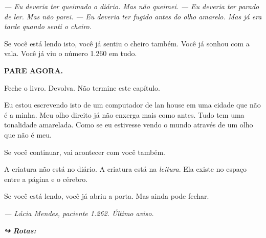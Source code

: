 \noindent \textit{--- Eu deveria ter queimado o diário. Mas não queimei.}
\textit{--- Eu deveria ter parado de ler. Mas não parei.}
\textit{--- Eu deveria ter fugido antes do olho amarelo. Mas já era tarde quando senti o cheiro.}

\noindent Se você está lendo isto, você já sentiu o cheiro também.
Você já sonhou com a vala.
Você já viu o número 1.260 em tudo.

\noindent \textbf{PARE AGORA.}

\noindent Feche o livro. Devolva. Não termine este capítulo.

\noindent Eu estou escrevendo isto de um computador de lan house em uma cidade que não é a minha. Meu olho direito já não enxerga mais como antes. Tudo tem uma tonalidade amarelada. Como se eu estivesse vendo o mundo através de um olho que não é meu.

\noindent Se você continuar, vai acontecer com você também.

\noindent A criatura não está no diário.
A criatura está na \textit{leitura}.
Ela existe no espaço entre a página e o cérebro.

\noindent Se você está lendo, você já abriu a porta.
Mas ainda pode fechar.

\noindent \textit{--- Lúcia Mendes, paciente 1.262. Último aviso.}

\vspace{0.5em}
\noindent\textit{\textbf{↪ Rotas:}  \rotasep {}}